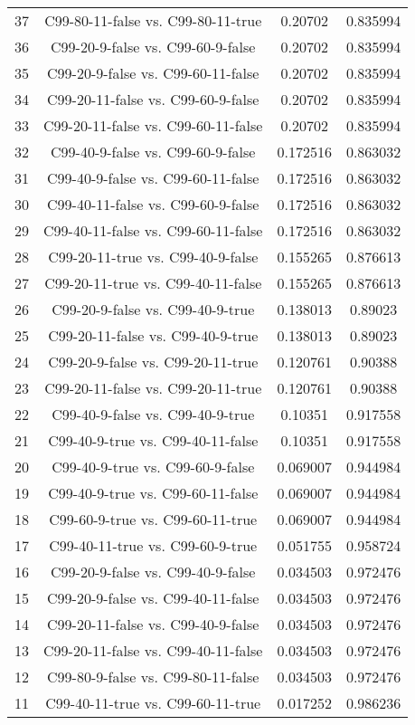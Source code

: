 \documentclass[a4paper,10pt]{article}
\begin{document}
\begin{landscape}
\begin{table}[!htp]
\begin{tabular}{cccc}
37&C99-80-11-false vs. C99-80-11-true&0.20702&0.835994\\
36&C99-20-9-false vs. C99-60-9-false&0.20702&0.835994\\
35&C99-20-9-false vs. C99-60-11-false&0.20702&0.835994\\
34&C99-20-11-false vs. C99-60-9-false&0.20702&0.835994\\
33&C99-20-11-false vs. C99-60-11-false&0.20702&0.835994\\
32&C99-40-9-false vs. C99-60-9-false&0.172516&0.863032\\
31&C99-40-9-false vs. C99-60-11-false&0.172516&0.863032\\
30&C99-40-11-false vs. C99-60-9-false&0.172516&0.863032\\
29&C99-40-11-false vs. C99-60-11-false&0.172516&0.863032\\
28&C99-20-11-true vs. C99-40-9-false&0.155265&0.876613\\
27&C99-20-11-true vs. C99-40-11-false&0.155265&0.876613\\
26&C99-20-9-false vs. C99-40-9-true&0.138013&0.89023\\
25&C99-20-11-false vs. C99-40-9-true&0.138013&0.89023\\
24&C99-20-9-false vs. C99-20-11-true&0.120761&0.90388\\
23&C99-20-11-false vs. C99-20-11-true&0.120761&0.90388\\
22&C99-40-9-false vs. C99-40-9-true&0.10351&0.917558\\
21&C99-40-9-true vs. C99-40-11-false&0.10351&0.917558\\
20&C99-40-9-true vs. C99-60-9-false&0.069007&0.944984\\
19&C99-40-9-true vs. C99-60-11-false&0.069007&0.944984\\
18&C99-60-9-true vs. C99-60-11-true&0.069007&0.944984\\
17&C99-40-11-true vs. C99-60-9-true&0.051755&0.958724\\
16&C99-20-9-false vs. C99-40-9-false&0.034503&0.972476\\
15&C99-20-9-false vs. C99-40-11-false&0.034503&0.972476\\
14&C99-20-11-false vs. C99-40-9-false&0.034503&0.972476\\
13&C99-20-11-false vs. C99-40-11-false&0.034503&0.972476\\
12&C99-80-9-false vs. C99-80-11-false&0.034503&0.972476\\
11&C99-40-11-true vs. C99-60-11-true&0.017252&0.986236\\

\end{tabular}
\end{table}
\end{landscape}
\end{document}
